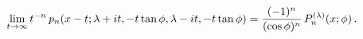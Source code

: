 \[\lim_{t\to\infty}t^{-n}\mathop{p_{n}\/}\nolimits\!\left(x-t;\lambda+it,-t%
\mathop{\tan\/}\nolimits\phi,\lambda-it,-t\mathop{\tan\/}\nolimits\phi\right)=%
\frac{(-1)^{n}}{(\mathop{\cos\/}\nolimits\phi)^{n}}\mathop{P^{(\lambda)}_{n}\/%
}\nolimits\!\left(x;\phi\right).\]